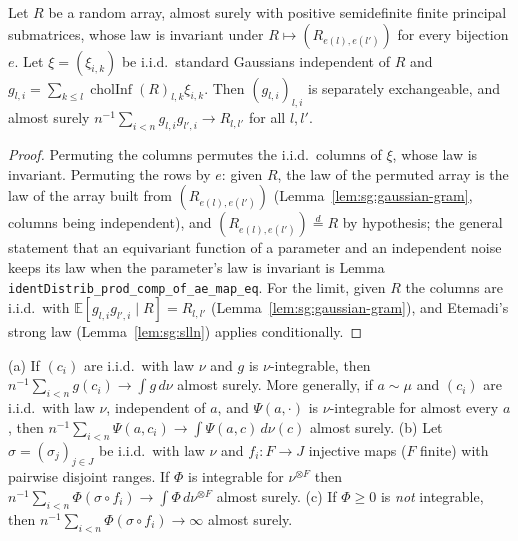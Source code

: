 \begin{theorem}\label{thm:sg:gaussian-array}
  \leanok
Let $R$ be a random array, almost surely with positive semidefinite finite principal submatrices, whose law is invariant under $R\mapsto(R_{e(l),e(l')})$ for every bijection $e$. Let $\xi=(\xi_{i,k})$ be i.i.d.\ standard Gaussians independent of $R$ and $g_{l,i}=\sum_{k\le l}\operatorname{cholInf}(R)_{l,k}\xi_{i,k}$. Then $(g_{l,i})_{l,i}$ is separately exchangeable, and almost surely $n^{-1}\sum_{i<n}g_{l,i}g_{l',i}\to R_{l,l'}$ for all $l,l'$.
\end{theorem}

\begin{proof}
  \leanok
{}
Permuting the columns permutes the i.i.d.\ columns of $\xi$, whose law is invariant. Permuting the rows by $e$: given $R$, the law of the permuted array is the law of the array built from $(R_{e(l),e(l')})$ (Lemma~\ref{lem:sg:gaussian-gram}, columns being independent), and $(R_{e(l),e(l')})\overset d=R$ by hypothesis; the general statement that an equivariant function of a parameter and an independent noise keeps its law when the parameter's law is invariant is Lemma \texttt{identDistrib\_prod\_comp\_of\_ae\_map\_eq}. For the limit, given $R$ the columns are i.i.d.\ with $\mathbb E[g_{l,i}g_{l',i}\mid R]=R_{l,l'}$ (Lemma~\ref{lem:sg:gaussian-gram}), and Etemadi's strong law (Lemma~\ref{lem:sg:slln}) applies conditionally.
\end{proof}

\begin{lemma}\label{lem:sg:slln}
  \leanok
(a) If $(c_i)$ are i.i.d.\ with law $\nu$ and $g$ is $\nu$-integrable, then $n^{-1}\sum_{i<n}g(c_i)\to\int g\,d\nu$ almost surely. More generally, if $a\sim\mu$ and $(c_i)$ are i.i.d.\ with law $\nu$, independent of $a$, and $\Psi(a,\cdot)$ is $\nu$-integrable for almost every $a$, then $n^{-1}\sum_{i<n}\Psi(a,c_i)\to\int\Psi(a,c)\,d\nu(c)$ almost surely.
(b) Let $\sigma=(\sigma_j)_{j\in J}$ be i.i.d.\ with law $\nu$ and $f_i:F\to J$ injective maps ($F$ finite) with pairwise disjoint ranges. If $\Phi$ is integrable for $\nu^{\otimes F}$ then $n^{-1}\sum_{i<n}\Phi(\sigma\circ f_i)\to\int\Phi\,d\nu^{\otimes F}$ almost surely.
(c) If $\Phi\ge0$ is \emph{not} integrable, then $n^{-1}\sum_{i<n}\Phi(\sigma\circ f_i)\to\infty$ almost surely.
\end{lemma}

